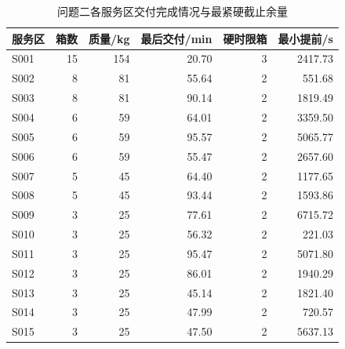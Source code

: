 \begin{table}[H]\centering\scriptsize
\caption{问题二各服务区交付完成情况与最紧硬截止余量}\label{tab:q2_service_delivery}
\begin{tabular}{lrrrrr}
\toprule
服务区 & 箱数 & 质量/kg & 最后交付/min & 硬时限箱 & 最小提前/s\\\midrule
S001 & 15 & 154 & 20.70 & 3 & 2417.73\\
S002 & 8 & 81 & 55.64 & 2 & 551.68\\
S003 & 8 & 81 & 90.14 & 2 & 1819.49\\
S004 & 6 & 59 & 64.01 & 2 & 3359.50\\
S005 & 6 & 59 & 95.57 & 2 & 5065.77\\
S006 & 6 & 59 & 55.47 & 2 & 2657.60\\
S007 & 5 & 45 & 64.40 & 2 & 1177.65\\
S008 & 5 & 45 & 93.44 & 2 & 1593.86\\
S009 & 3 & 25 & 77.61 & 2 & 6715.72\\
S010 & 3 & 25 & 56.32 & 2 & 221.03\\
S011 & 3 & 25 & 95.47 & 2 & 5071.80\\
S012 & 3 & 25 & 86.01 & 2 & 1940.29\\
S013 & 3 & 25 & 45.14 & 2 & 1821.40\\
S014 & 3 & 25 & 47.99 & 2 & 720.57\\
S015 & 3 & 25 & 47.50 & 2 & 5637.13\\
\bottomrule\end{tabular}
\end{table}
